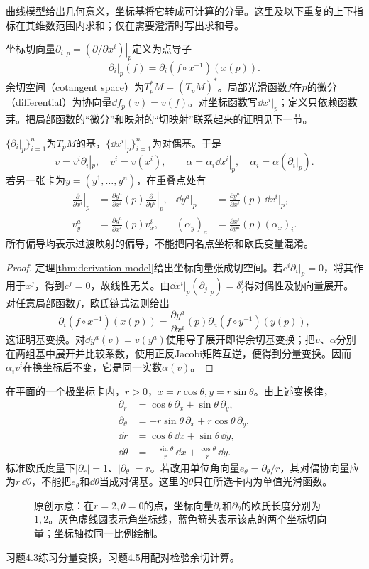 曲线模型给出几何意义，坐标基将它转成可计算的分量。这里及以下重复的上下指标在其维数范围内求和；仅在需要澄清时写出求和号。
\begin{definition}[坐标基与余切空间]
坐标切向量$\partial_i|_p=(\partial/\partial x^i)|_p$定义为点导子
\[
 \partial_i|_p(f)=\partial_i(f\circ x^{-1})(x(p)).
\]
余切空间（cotangent space）为$T_p^*M=(T_pM)^*$。局部光滑函数$f$在$p$的微分（differential）为协向量$\dd f_p(v)=v(f)$。对坐标函数写$\dd x^i|_p$；定义只依赖函数芽。把局部函数的“微分”和映射的“切映射”联系起来的证明见下一节。
\end{definition}
\begin{theorem}\label{thm:tangent-coordinate}
$\{\partial_i|_p\}_{i=1}^n$为$T_pM$的基，$\{\dd x^i|_p\}_{i=1}^n$为对偶基。于是
\[
 v=v^i\partial_i|_p,\quad v^i=v(x^i),\qquad
 \alpha=\alpha_i\dd x^i|_p,\quad\alpha_i=\alpha(\partial_i|_p).
\]
若另一张卡为$y=(y^1,\ldots,y^n)$，在重叠点处有
\begin{align*}
 \left.\frac{\partial}{\partial x^i}\right|_p
 &=\frac{\partial y^a}{\partial x^i}(p)
 \left.\frac{\partial}{\partial y^a}\right|_p,
 &\dd y^a|_p&=\frac{\partial y^a}{\partial x^i}(p)\,\dd x^i|_p,\\
 v_y^a&=\frac{\partial y^a}{\partial x^i}(p)v_x^i,
 &(\alpha_y)_a&=\frac{\partial x^i}{\partial y^a}(p)(\alpha_x)_i.
\end{align*}
所有偏导均表示过渡映射的偏导，不能把同名点坐标和欧氏变量混淆。
\end{theorem}
\begin{proof}
定理\ref{thm:derivation-model}给出坐标向量张成切空间。若$c^i\partial_i|_p=0$，将其作用于$x^j$，得到$c^j=0$，故线性无关。由$\dd x^i|_p(\partial_j|_p)=\delta^i_j$得对偶性及协向量展开。
对任意局部函数$f$，欧氏链式法则给出
\[
 \partial_i(f\circ x^{-1})(x(p))
 =\frac{\partial y^a}{\partial x^i}(p)
 \partial_a(f\circ y^{-1})(y(p)),
\]
这证明基变换。对$\dd y^a(v)=v(y^a)$使用导子展开即得余切基变换；把$v$、$\alpha$分别在两组基中展开并比较系数，使用正反Jacobi矩阵互逆，便得到分量变换。因而$\alpha_i v^i$在换坐标后不变，它是同一实数$\alpha(v)$。
\end{proof}
\begin{example}[极坐标基不是单位基]\label{ex:polar-tangent}
在平面的一个极坐标卡内，$r>0$，$x=r\cos\theta,y=r\sin\theta$。由上述变换律，
\begin{align*}
 \partial_r&=\cos\theta\,\partial_x+\sin\theta\,\partial_y,\\
 \partial_\theta&=-r\sin\theta\,\partial_x+r\cos\theta\,\partial_y,\\
 \dd r&=\cos\theta\,\dd x+\sin\theta\,\dd y,\\
 \dd\theta&=-\frac{\sin\theta}{r}\,\dd x+\frac{\cos\theta}{r}\,\dd y.
\end{align*}
标准欧氏度量下$|\partial_r|=1$、$|\partial_\theta|=r$。若改用单位角向量$e_\theta=\partial_\theta/r$，其对偶协向量应为$r\,\dd\theta$，不能把$e_\theta$和$\dd\theta$当成对偶基。这里的$\theta$只在所选卡内为单值光滑函数。
\end{example}
\begin{figure}[htbp]
\centering

\caption{原创示意：在$r=2,\theta=0$的点，坐标向量$\partial_r$和$\partial_\theta$的欧氏长度分别为$1,2$。灰色虚线圆表示角坐标线，蓝色箭头表示该点的两个坐标切向量；坐标轴按同一比例绘制。}
\end{figure}
习题4.3练习分量变换，习题4.5用配对检验余切计算。
